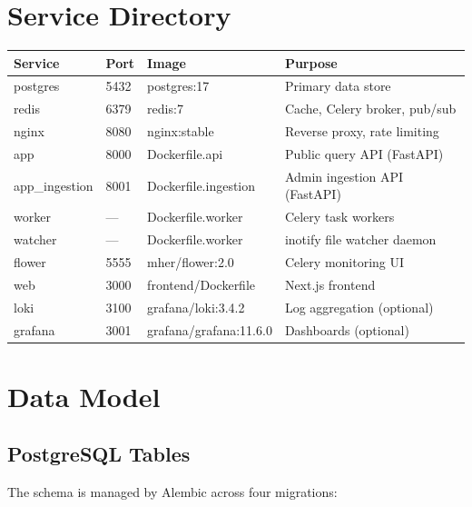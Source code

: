 \documentclass[11pt,a4paper]{article}
\begin{document}
\section{Service Directory}

\begin{longtable}{@{}lllp{5.5cm}@{}}
\toprule
\textbf{Service} & \textbf{Port} & \textbf{Image} & \textbf{Purpose} \\
\midrule
\endhead
postgres     & 5432 & postgres:17          & Primary data store \\
redis        & 6379 & redis:7              & Cache, Celery broker, pub/sub \\
nginx        & 8080 & nginx:stable         & Reverse proxy, rate limiting \\
app          & 8000 & Dockerfile.api       & Public query API (FastAPI) \\
app\_ingestion & 8001 & Dockerfile.ingestion & Admin ingestion API (FastAPI) \\
worker       & ---  & Dockerfile.worker    & Celery task workers \\
watcher      & ---  & Dockerfile.worker    & inotify file watcher daemon \\
flower       & 5555 & mher/flower:2.0      & Celery monitoring UI \\
web          & 3000 & frontend/Dockerfile  & Next.js frontend \\
loki         & 3100 & grafana/loki:3.4.2   & Log aggregation (optional) \\
grafana      & 3001 & grafana/grafana:11.6.0 & Dashboards (optional) \\
\bottomrule
\end{longtable}

\section{Data Model}

\subsection{PostgreSQL Tables}

The schema is managed by Alembic across four migrations:
\end{document}
